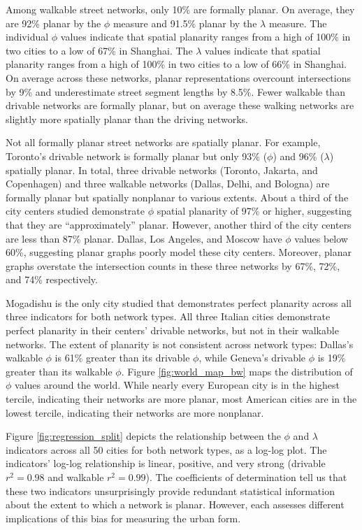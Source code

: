 \documentclass[Afour,sageh,times]{sagej}
\begin{document}
Among walkable street networks, only 10\% are formally planar. On average, they are 92\% planar by the $\phi$ measure and 91.5\% planar by the $\lambda$ measure. The individual $\phi$ values indicate that spatial planarity ranges from a high of 100\% in two cities to a low of 67\% in Shanghai. The $\lambda$ values indicate that spatial planarity ranges from a high of 100\% in two cities to a low of 66\% in Shanghai. On average across these networks, planar representations overcount intersections by 9\% and underestimate street segment lengths by 8.5\%. Fewer walkable than drivable networks are formally planar, but on average these walking networks are slightly more spatially planar than the driving networks.

Not all formally planar street networks are spatially planar. For example, Toronto's drivable network is formally planar but only 93\% ($\phi$) and 96\% ($\lambda$) spatially planar. In total, three drivable networks (Toronto, Jakarta, and Copenhagen) and three walkable networks (Dallas, Delhi, and Bologna) are formally planar but spatially nonplanar to various extents. About a third of the city centers studied demonstrate $\phi$ spatial planarity of 97\% or higher, suggesting that they are \enquote{approximately} planar. However, another third of the city centers are less than 87\% planar. Dallas, Los Angeles, and Moscow have $\phi$ values below 60\%, suggesting planar graphs poorly model these city centers. Moreover, planar graphs overstate the intersection counts in these three networks by 67\%, 72\%, and 74\% respectively.

Mogadishu is the only city studied that demonstrates perfect planarity across all three indicators for both network types. All three Italian cities demonstrate perfect planarity in their centers' drivable networks, but not in their walkable networks. The extent of planarity is not consistent across network types: Dallas's walkable $\phi$ is 61\% greater than its drivable $\phi$, while Geneva's drivable $\phi$ is 19\% greater than its walkable $\phi$. Figure \ref{fig:world_map_bw} maps the distribution of $\phi$ values around the world. While nearly every European city is in the highest tercile, indicating their networks are more planar, most American cities are in the lowest tercile, indicating their networks are more nonplanar.

Figure \ref{fig:regression_split} depicts the relationship between the $\phi$ and $\lambda$ indicators across all 50 cities for both network types, as a log-log plot. The indicators' log-log relationship is linear, positive, and very strong (drivable $r^2=0.98$ and walkable $r^2=0.99$). The coefficients of determination tell us that these two indicators unsurprisingly provide redundant statistical information about the extent to which a network is planar. However, each assesses different implications of this bias for measuring the urban form.
\end{document}
